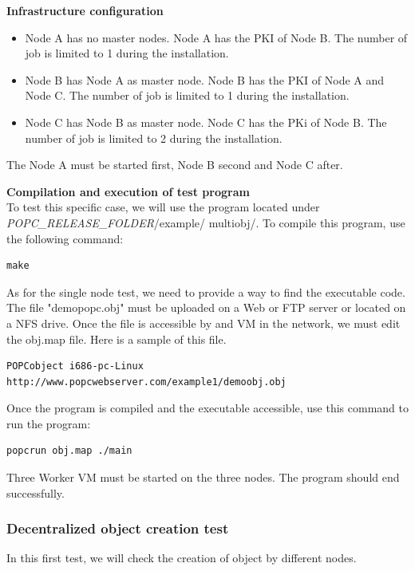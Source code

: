 \textbf{Infrastructure configuration}\\
\begin{itemize}
\item Node A has no master nodes. Node A has the PKI of Node B. The number of job is limited to 1 during the installation.
\item Node B has Node A as master node. Node B has the PKI of Node A and Node C. The number of job is limited to 1 during the installation.
\item Node C has Node B as master node. Node C has the PKi of Node B. The number of job is limited to 2 during the installation.
\end{itemize}
The Node A must be started first, Node B second and Node C after. \s


\textbf{Compilation and execution of test program}\\
To test this specific case, we will use the program located under \textit{POPC\_RELEASE\_FOLDER}/example/ multiobj/. To compile  this program, use the following command:\s

\begin{lstlisting}
make
\end{lstlisting}\s

As for the single node test, we need to provide a way to find the executable code. The file "demopopc.obj" must be uploaded on a Web or FTP server or located on a NFS drive. Once the file is accessible by and VM in the network, we must edit the obj.map file. Here is a sample of this file. \s
\begin{lstlisting}
POPCobject i686-pc-Linux http://www.popcwebserver.com/example1/demoobj.obj
\end{lstlisting}\s


Once the program is compiled and the executable accessible, use this command to run the program:\s
\begin{lstlisting}
popcrun obj.map ./main
\end{lstlisting}\s

Three Worker VM must be started on the three nodes. The program should end successfully. 


%
%

\subsubsection{Decentralized object creation test}
In this first test, we will check the creation of object by different nodes. \s

